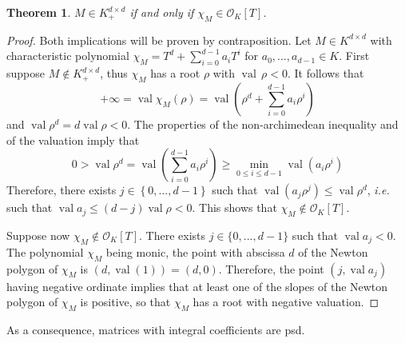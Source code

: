 \documentclass{elsarticle}
\theoremstyle{plain}
\newtheorem{theorem}{Theorem}[section]
\theoremstyle{definition}
\DeclareMathOperator{\val}{val}
\newcommand{\OK}{\mathcal{O}_K}
\begin{document}
\begin{theorem}
  \label{caracsdp}
  $M \in K^{d\times d}_+$ if and only if $\chi_M \in \OK[T]$.
\end{theorem}
\begin{proof}
  Both implications will be proven by contraposition.
  Let $M \in K^{d\times d}$ with characteristic polynomial $\chi_M = T^d + \sum_{i=0}^{d-1} a_i T^i$ for $a_0,...,a_{d-1} \in K$.
  First suppose $M \not \in K^{d\times d}_+$, thus $\chi_M$ has a root $\rho$ with $\val\,\rho<0$.
  It follows that
  $$
  + \infty = \val \chi_M (\rho) = \val \left(\rho^d+ \sum_{i=0}^{d-1} a_i \rho^i\right)
  $$ and $\val \rho^d = d \val \rho <0$.
  The properties of the non-archimedean inequality and of the valuation imply that
  $$
  0> \val \rho^d = \val\left(\sum_{i=0}^{d-1} a_i \rho^i\right) \geq
  \min_{0 \leq i \leq d-1} \val \left(a_i \rho^i\right)
  $$
  Therefore, there exists $j \in \left\{0,...,d-1\right\}$ such that $\val(a_j \rho^j) \le \val\rho^d$,
  {\it i.e.} such that $\val a_j \le (d-j) \val \rho <0$. This shows that $\chi_M \not\in \OK[T]$.
  

  Suppose now $\chi_M \not\in \OK[T]$. There exists $j \in \{0,...,d-1\}$ such that $\val a_j <0$.
  The polynomial $\chi_M$ being monic, the point with abscissa $d$ of the Newton polygon of $\chi_M$ is
  $(d,\val(1)) = (d,0)$. 
  Therefore, the point $(j, \val a_j)$ having negative ordinate implies that at least one of the slopes of
  the Newton polygon of $\chi_M$ is positive, so that $\chi_M$ has a root with negative valuation.
\end{proof}

As a consequence, matrices with integral coefficients are psd.
\end{document}
